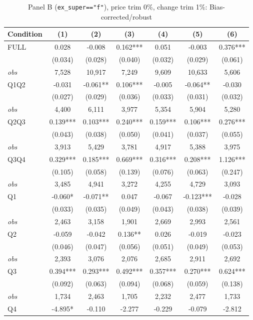\documentclass[11pt]{article}
\begin{document}
\begin{table}[!htbp]
\centering
\caption{Panel B (\texttt{ex\_super=="f"}), price trim 0\%, change trim 1\%: Bias-corrected/robust}
\label{tab:b:trim01:robust}
\small
\begin{tabular}{lcccccc}
\toprule
Condition & (1) & (2) & (3) & (4) & (5) & (6) \\
\midrule
FULL & 0.028 & -0.008 & 0.162*** & 0.051 & -0.003 & 0.376*** \\
 & (0.034) & (0.028) & (0.040) & (0.032) & (0.029) & (0.061) \\
\textit{obs} &  7,528 & 10,917 &  7,249 &  9,609 & 10,633 &  5,606 \\
Q1Q2 & -0.031 & -0.061** & 0.106*** & -0.005 & -0.064** & -0.030 \\
 & (0.027) & (0.029) & (0.036) & (0.033) & (0.031) & (0.032) \\
\textit{obs} & 4,400 & 6,111 & 3,977 & 5,354 & 5,904 & 5,280 \\
Q2Q3 & 0.139*** & 0.103*** & 0.240*** & 0.159*** & 0.106*** & 0.276*** \\
 & (0.043) & (0.038) & (0.050) & (0.041) & (0.037) & (0.055) \\
\textit{obs} & 3,913 & 5,429 & 3,781 & 4,917 & 5,388 & 3,975 \\
Q3Q4 & 0.329*** & 0.185*** & 0.669*** & 0.316*** & 0.208*** & 1.126*** \\
 & (0.105) & (0.058) & (0.139) & (0.076) & (0.063) & (0.247) \\
\textit{obs} & 3,485 & 4,941 & 3,272 & 4,255 & 4,729 & 3,093 \\
Q1 & -0.060* & -0.071** & 0.047 & -0.067 & -0.123*** & -0.028 \\
 & (0.033) & (0.035) & (0.049) & (0.043) & (0.038) & (0.039) \\
\textit{obs} & 2,463 & 3,158 & 1,901 & 2,669 & 2,993 & 2,561 \\
Q2 & -0.059 & -0.042 & 0.136** & 0.026 & -0.019 & -0.023 \\
 & (0.046) & (0.047) & (0.056) & (0.051) & (0.049) & (0.053) \\
\textit{obs} & 2,393 & 3,076 & 2,076 & 2,685 & 2,911 & 2,692 \\
Q3 & 0.394*** & 0.293*** & 0.492*** & 0.357*** & 0.270*** & 0.624*** \\
 & (0.092) & (0.063) & (0.094) & (0.068) & (0.059) & (0.138) \\
\textit{obs} & 1,734 & 2,463 & 1,705 & 2,232 & 2,477 & 1,733 \\
Q4 & -4.895* & -0.110 & -2.277 & -0.229 & -0.079 & -2.812 \\

\end{tabular}
\end{table}
\end{document}
